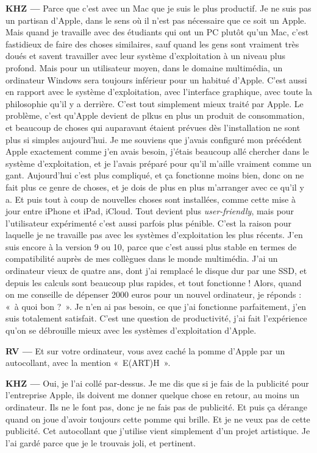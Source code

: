 \documentclass[a4paper,12pt]{article}
\newcommand{\guill}[1]{«~#1~»}
\begin{document}
\textbf{KHZ ---} Parce que c'est avec un Mac que je suis le plus productif. Je ne suis pas un partisan d'Apple, dans le sens où il n'est pas nécessaire que ce soit un Apple. Mais quand je travaille avec des étudiants qui ont un PC plutôt qu'un Mac, c'est fastidieux de faire des choses similaires, sauf quand les gens sont vraiment très doués et savent travailler avec leur système d'exploitation à un niveau plus profond. Mais pour un utilisateur moyen, dans le domaine multimédia, un ordinateur Windows sera toujours inférieur pour un habitué d'Apple. C'est aussi en rapport avec le système d'exploitation, avec l'interface graphique, avec toute la philosophie qu'il y a derrière. C'est tout simplement mieux traité par Apple. Le problème, c'est qu'Apple devient de plkus en plus un produit de consommation, et beaucoup de choses qui auparavant étaient prévues dès l'installation ne sont plus si simples aujourd'hui. Je me souviens que j'avais configuré mon précédent Apple exactement comme j'en avais besoin, j'étais beaucoup allé chercher dans le système d'exploitation, et je l'avais préparé pour qu'il m'aille vraiment comme un gant. Aujourd'hui c'est plus compliqué, et ça fonctionne moins bien, donc on ne fait plus ce genre de choses, et je dois de plus en plus m'arranger avec ce qu'il y a. Et puis tout à coup de nouvelles choses sont installées, comme cette mise à jour entre iPhone et iPad, iCloud. Tout devient plus \emph{user-friendly}, mais pour l'utilisateur expérimenté c'est aussi parfois plus pénible. C'est la raison pour laquelle je ne travaille pas avec les systèmes d'exploitation les plus récents. J'en suis encore à la version 9 ou 10, parce que c'est aussi plus stable en termes de compatibilité auprès de mes collègues dans le monde multimédia. J'ai un ordinateur vieux de quatre ans, dont j'ai remplacé le disque dur par une SSD, et depuis les calculs sont beaucoup plus rapides, et tout fonctionne ! Alors, quand on me conseille de dépenser 2000 euros pour un nouvel ordinateur, je réponds : \guill{à quoi bon ?}. Je n'en ai pas besoin, ce que j'ai fonctionne parfaitement, j'en suis totalement satisfait. C'est une question de productivité, j'ai fait l'expérience qu'on se débrouille mieux avec les systèmes d'exploitation d'Apple.

\textbf{RV ---} Et sur votre ordinateur, vous avez caché la pomme d'Apple par un autocollant, avec la mention \guill{E(ART)H}.

\textbf{KHZ ---} Oui, je l'ai collé par-dessus. Je me dis que si je fais de la publicité pour l'entreprise Apple, ils doivent me donner quelque chose en retour, au moins un ordinateur. Ils ne le font pas, donc je ne fais pas de publicité. Et puis ça dérange quand on joue d'avoir toujours cette pomme qui brille. Et je ne veux pas de cette publicité. Cet autocollant que j'utilise vient simplement d'un projet artistique. Je l'ai gardé parce que je le trouvais joli, et pertinent.
\end{document}
